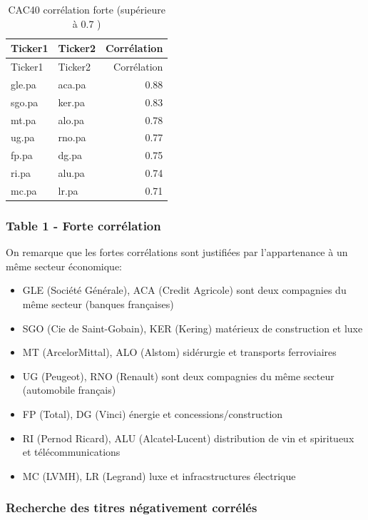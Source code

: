 \documentclass[
]{article}
\providecommand{\tightlist}{%
  \setlength{\itemsep}{0pt}\setlength{\parskip}{0pt}}
\begin{document}
\begin{longtable}[]{@{}llr@{}}
\caption{CAC40 corrélation forte (supérieure à 0.7 )}\tabularnewline
\toprule
Ticker1 & Ticker2 & Corrélation\tabularnewline
\midrule
\endfirsthead
\toprule
Ticker1 & Ticker2 & Corrélation\tabularnewline
\midrule
\endhead
gle.pa & aca.pa & 0.88\tabularnewline
sgo.pa & ker.pa & 0.83\tabularnewline
mt.pa & alo.pa & 0.78\tabularnewline
ug.pa & rno.pa & 0.77\tabularnewline
fp.pa & dg.pa & 0.75\tabularnewline
ri.pa & alu.pa & 0.74\tabularnewline
mc.pa & lr.pa & 0.71\tabularnewline
\bottomrule
\end{longtable}

\hypertarget{table-1---forte-corruxe9lation}{%
\subsubsection{Table 1 - Forte
corrélation}\label{table-1---forte-corruxe9lation}}

On remarque que les fortes corrélations sont justifiées par
l'appartenance à un même secteur économique:

\begin{itemize}
\tightlist
\item
  GLE (Société Générale), ACA (Credit Agricole) sont deux compagnies du
  même secteur (banques françaises)
\item
  SGO (Cie de Saint-Gobain), KER (Kering) matérieux de construction et
  luxe
\item
  MT (ArcelorMittal), ALO (Alstom) sidérurgie et transports ferroviaires
\item
  UG (Peugeot), RNO (Renault) sont deux compagnies du même secteur
  (automobile français)
\item
  FP (Total), DG (Vinci) énergie et concessions/construction
\item
  RI (Pernod Ricard), ALU (Alcatel-Lucent) distribution de vin et
  spiritueux et télécommunications
\item
  MC (LVMH), LR (Legrand) luxe et infracstructures électrique
\end{itemize}

\hypertarget{recherche-des-titres-nuxe9gativement-corruxe9luxe9s}{%
\subsubsection{Recherche des titres négativement
corrélés}\label{recherche-des-titres-nuxe9gativement-corruxe9luxe9s}}
\end{document}
